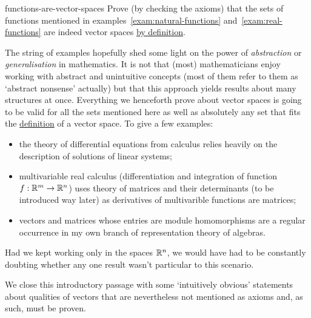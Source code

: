 \begin{exercise}{}{functions-are-vector-spaces}
 Prove (by checking the axioms) that the sets of functions mentioned in
 examples~\ref{exam:natural-functions} and~\ref{exam:real-functions} are indeed
 vector spaces  \hyperref[def:abstract-vector-space]{by definition}.
\end{exercise}

The string of examples hopefully shed some light on the power of
\emph{abstraction} or \emph{generalisation} in mathematics. It is not that
(most) mathematicians enjoy working with abstract and unintuitive concepts (most
of them refer to them as `abstract nonsense' actually) but that this approach
yields results about many structures at once. Everything we henceforth prove
about vector spaces is going to be valid for all the sets mentioned here as well
as absolutely any set that fits the
\hyperref[def:abstract-vector-space]{definition} of a vector space. To give a
few examples:
\begin{itemize}
 \item the theory of differential equations from calculus relies heavily on the
  description of solutions of linear systems;
 \item multivariable real calculus (differentiation and integration of function
  $f:\mathbb{R}^{m} \to \mathbb{R}^{n}$) uses theory of matrices and their determinants (to be
  introduced way later) as derivatives of multivarible functions are matrices;
 \item vectors and matrices whose entries are module homomorphisms are a regular
  occurrence in my own branch of representation theory of algebras.
\end{itemize}
Had we kept working only in the spaces $\mathbb{R}^{n}$, we would have had to be
constantly doubting whether any one result wasn't particular to this scenario.

We close this introductory passage with some `intuitively obvious' statements
about qualities of vectors that are nevertheless not mentioned as axioms and, as
such, must be proven.

